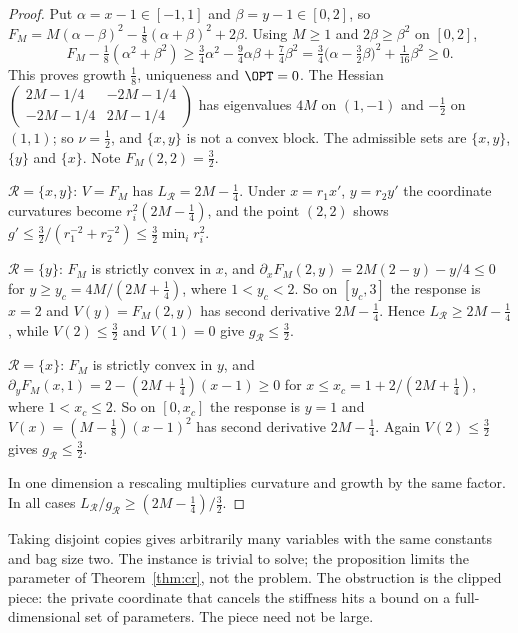 \begin{proof}
Put $\alpha=x-1\in[-1,1]$ and $\beta=y-1\in[0,2]$, so
$F_M=M(\alpha-\beta)^2-\frac18(\alpha+\beta)^2+2\beta$. Using $M\ge1$ and
$2\beta\ge\beta^2$ on $[0,2]$,
\[
F_M-\tfrac18(\alpha^2+\beta^2)\ge\tfrac34\alpha^2-\tfrac94\alpha\beta+\tfrac74\beta^2
=\tfrac34\bigl(\alpha-\tfrac32\beta\bigr)^2+\tfrac1{16}\beta^2\ge0.
\]
This proves growth $\frac18$, uniqueness and $\OPT=0$. The Hessian
$\left(\begin{smallmatrix}2M-1/4&-2M-1/4\\-2M-1/4&2M-1/4\end{smallmatrix}\right)$
has eigenvalues $4M$ on $(1,-1)$ and $-\frac12$ on $(1,1)$; so $\nu=\frac12$,
and $\{x,y\}$ is not a convex block. The admissible sets are $\{x,y\}$,
$\{y\}$ and $\{x\}$. Note $F_M(2,2)=\frac32$.

$\mathcal R=\{x,y\}$: $V=F_M$ has $L_{\mathcal R}=2M-\frac14$. Under
$x=r_1x'$, $y=r_2y'$ the coordinate curvatures become $r_i^2(2M-\frac14)$, and
the point $(2,2)$ shows $g'\le\frac32/(r_1^{-2}+r_2^{-2})\le\frac32\min_ir_i^2$.

$\mathcal R=\{y\}$: $F_M$ is strictly convex in $x$, and
$\partial_xF_M(2,y)=2M(2-y)-y/4\le0$ for $y\ge y_c=4M/(2M+\frac14)$, where
$1<y_c<2$. So on $[y_c,3]$ the response is $x=2$ and
$V(y)=F_M(2,y)$ has second derivative $2M-\frac14$. Hence
$L_{\mathcal R}\ge2M-\frac14$, while $V(2)\le\frac32$ and $V(1)=0$ give
$g_{\mathcal R}\le\frac32$.

$\mathcal R=\{x\}$: $F_M$ is strictly convex in $y$, and
$\partial_yF_M(x,1)=2-(2M+\frac14)(x-1)\ge0$ for
$x\le x_c=1+2/(2M+\frac14)$, where $1<x_c\le2$. So on $[0,x_c]$ the response
is $y=1$ and $V(x)=(M-\frac18)(x-1)^2$ has second derivative $2M-\frac14$.
Again $V(2)\le\frac32$ gives $g_{\mathcal R}\le\frac32$.

In one dimension a rescaling multiplies curvature and growth by the same
factor. In all cases $L_{\mathcal R}/g_{\mathcal R}\ge(2M-\frac14)/\frac32$.
\end{proof}

Taking disjoint copies gives arbitrarily many variables with the same
constants and bag size two. The instance is trivial to solve; the proposition
limits the parameter of Theorem~\ref{thm:cr}, not the problem. The obstruction
is the clipped piece: the private coordinate that cancels the stiffness hits a
bound on a full-dimensional set of parameters. The piece need not be large.

